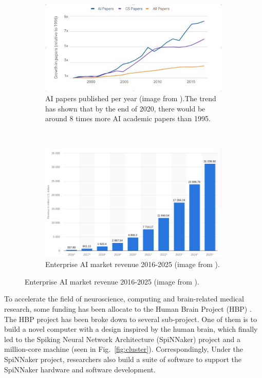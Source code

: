 \begin{figure}[!ht]
   \centering
   \begin{subfigure}[b]{0.9\textwidth}
       \includegraphics[width=\textwidth]{figures/ai_paper.png}
       \caption{AI papers published per year (image from \cite{ai-papers}).The trend has shown that by the end of 2020, there would be around 8 times more AI academic papers than 1995.}
       \label{fig:ai-papers}
   \end{subfigure}
      ~
   \centering
   \begin{subfigure}[b]{0.9\textwidth}
       \includegraphics[width=\textwidth]{figures/ai_enterprise.png}
       \caption{Enterprise AI market revenue 2016-2025 (image from \cite{ai-proj}). }
       \label{fig:ai-proj}
   \end{subfigure}%
\end{figure}

To accelerate the field of neuroscience, computing and brain-related medical research, some funding has been allocate to the Human Brain Project (HBP) \cite{hbp}. The HBP project has been broke down to several sub-project. One of them is to build a novel computer with a design inspired by the human brain, which finally led to the Spiking Neural Network Architecture (SpiNNaker) project and a million-core machine (seen in Fig.~\ref{fig:cluster}). Correspondingly, Under the SpiNNaker project, researchers also build a suite of software to support the SpiNNaker hardware and software development.\\

